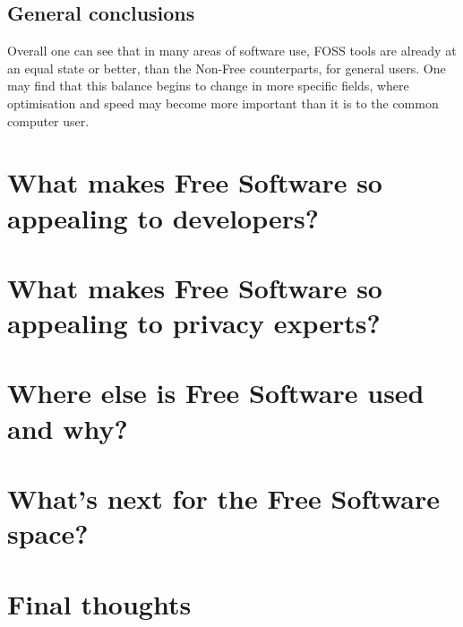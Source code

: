\documentclass[a4paper,12pt]{article}
\begin{document}
{\subsection{General conclusions}
Overall one can see that in many areas of software use, FOSS tools are already at an equal state or better, than the Non-Free
counterparts, for general users. One may find that this balance begins to change in more specific fields, where optimisation and
speed may become more important than it is to the common computer user.

\section{What makes Free Software so appealing to developers?}
\section{What makes Free Software so appealing to privacy experts?}
\section{Where else is Free Software used and why?}
\section{What's next for the Free Software space?}
\section{Final thoughts}

\newpage
\printbibliography
}
\end{document}
